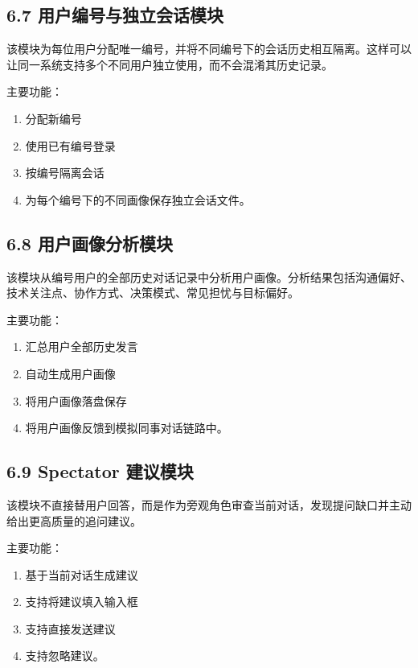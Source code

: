 \documentclass[12pt,a4paper]{article}
\begin{document}
\subsection*{6.7 用户编号与独立会话模块}
\vspace{0.45em}
该模块为每位用户分配唯一编号，并将不同编号下的会话历史相互隔离。这样可以让同一系统支持多个不同用户独立使用，而不会混淆其历史记录。\par
\vspace{0.45em}
主要功能：\par
\vspace{0.45em}
\begin{enumerate}
\item 分配新编号
\item 使用已有编号登录
\item 按编号隔离会话
\item 为每个编号下的不同画像保存独立会话文件。
\end{enumerate}
\vspace{0.45em}
\subsection*{6.8 用户画像分析模块}
\vspace{0.45em}
该模块从编号用户的全部历史对话记录中分析用户画像。分析结果包括沟通偏好、技术关注点、协作方式、决策模式、常见担忧与目标偏好。\par
\vspace{0.45em}
主要功能：\par
\vspace{0.45em}
\begin{enumerate}
\item 汇总用户全部历史发言
\item 自动生成用户画像
\item 将用户画像落盘保存
\item 将用户画像反馈到模拟同事对话链路中。
\end{enumerate}
\vspace{0.45em}
\subsection*{6.9 Spectator 建议模块}
\vspace{0.45em}
该模块不直接替用户回答，而是作为旁观角色审查当前对话，发现提问缺口并主动给出更高质量的追问建议。\par
\newpage
{}
\fancyhead[R]{}
\vspace{0.45em}
主要功能：\par
\vspace{0.45em}
\begin{enumerate}
\item 基于当前对话生成建议
\item 支持将建议填入输入框
\item 支持直接发送建议
\item 支持忽略建议。
\end{enumerate}
\vspace{0.45em}
\end{document}
